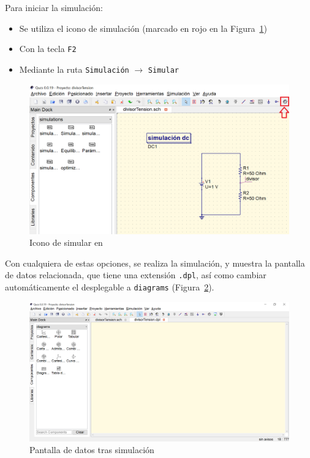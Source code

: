 \documentclass[a4paper,10pt]{article} %
\begin{document}
Para iniciar la simulación:
\begin{itemize}
    \item Se utiliza el icono de simulación (marcado en rojo en la Figura~\ref{fig.qucs10})
    \item Con la tecla \texttt{F2}
    \item Mediante la ruta \texttt{Simulación} $\rightarrow$ \texttt{Simular}
\end{itemize}
    \begin{figure}[htbp]
        \centering
        \includegraphics[width=0.7\linewidth]{../figs/qucs10.png}
        \caption{Icono de simular en \qucs}
        \label{fig.qucs10}
    \end{figure}

Con cualquiera de estas opciones, se realiza la simulación, y {\qucs} muestra la pantalla de datos relacionada, que tiene una extensión \texttt{.dpl}, así como cambiar automáticamente el desplegable a \texttt{diagrams} (Figura~\ref{fig.qucs11}). 
\begin{figure}[htbp]
    \centering
    \includegraphics[width=\linewidth]{../figs/qucs11.PNG}
    \caption{Pantalla de datos tras simulación}
    \label{fig.qucs11}
\end{figure}
\end{document}
